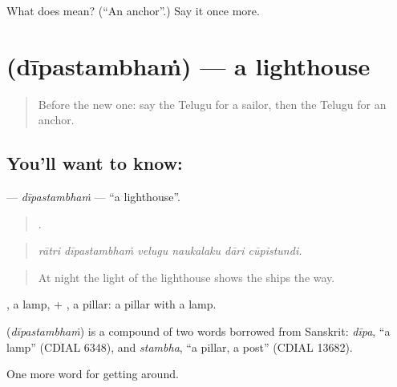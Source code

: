 \begin{tcolorbox}[breakable,colback=teal!4,colframe=teal!35!black,title={Before you move on}]
What does  mean? (\textquotedblleft{}An anchor\textquotedblright{}.) Say it once more.
\end{tcolorbox}
\section[\texorpdfstring{\te{దీపస్తంభం} (dīpastambhaṁ)}{దీపస్తంభం (dīpastambhaṁ)}]{ (dīpastambhaṁ) — a lighthouse}

\label{lesson:TE-C452-dipastambham}



\begin{quote}
Before the new one: say the Telugu for a sailor, then the Telugu for an anchor.
\end{quote}

\subsection*{You'll want to know: }
\textbf{} — \emph{dīpastambhaṁ} — \textquotedblleft{}a lighthouse\textquotedblright{}.

\begin{quote}
     .
\end{quote}

\begin{quote}
\emph{rātri dīpastambhaṁ velugu naukalaku dāri cūpistundi.}
\end{quote}

\begin{quote}
At night the light of the lighthouse shows the ships the way.
\end{quote}

, a lamp, + , a pillar: a pillar with a lamp.

\begin{cousinweb}
\textbf{} (\emph{dīpastambhaṁ}) is a compound of two words borrowed from Sanskrit: \emph{dīpa}, \textquotedblleft{}a lamp\textquotedblright{} (CDIAL 6348), and \emph{stambha}, \textquotedblleft{}a pillar, a post\textquotedblright{} (CDIAL 13682).
\end{cousinweb}

\begin{grammarlens}[title={What you've built}]
One more word for getting around.
\end{grammarlens}

